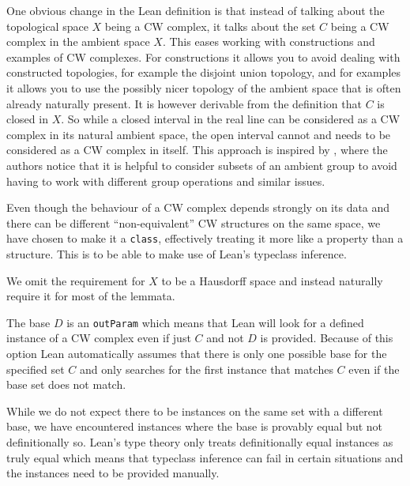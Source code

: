 One obvious change in the Lean definition is that instead of talking about the topological space $X$ being a CW complex, it talks about the set $C$ being a CW complex in the ambient space $X$.
This eases working with constructions and examples of CW complexes. 
For constructions it allows you to avoid dealing with constructed topologies, for example the disjoint union topology, and for examples it allows you to use the possibly nicer topology of the ambient space that is often already naturally present. 
It is however derivable from the definition that $C$ is closed in $X$. 
So while a closed interval in the real line can be considered as a CW complex in its natural ambient space, the open interval cannot and needs to be considered as a CW complex in itself. 
This approach is inspired by \cite{Gonthier2013}, where the authors notice that it is helpful to consider subsets of an ambient group to avoid having to work with different group operations and similar issues.

Even though the behaviour of a CW complex depends strongly on its data and there can be different ``non-equivalent'' CW structures on the same space, we have chosen to make it a \lstinline|class|, effectively treating it more like a property than a structure. 
This is to be able to make use of Lean's typeclass inference. 

We omit the requirement for $X$ to be a Hausdorff space and instead naturally require it for most of the lemmata. 

The base $D$ is an \lstinline|outParam| which means that Lean will look for a defined instance of a CW complex even if just $C$ and not $D$ is provided. 
Because of this option Lean automatically assumes that there is only one possible base for the specified set $C$ and only searches for the first instance that matches $C$ even if the base set does not match. 

While we do not expect there to be instances on the same set with a different base, we have encountered instances where the base is provably equal but not definitionally so. 
Lean's type theory only treats definitionally equal instances as truly equal which means that typeclass inference can fail in certain situations and the instances need to be provided manually. 

